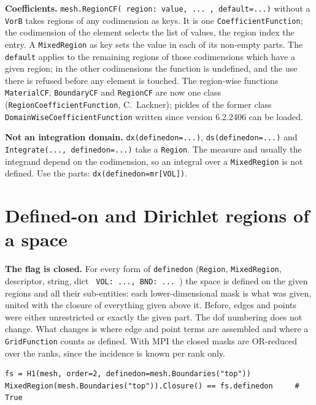 \documentclass[10pt,a4paper]{article}
\newcommand{\code}[1]{\texttt{#1}}
\newcommand{\lbr}{\char123 }\newcommand{\rbr}{\char125 }\newcommand{\tld}{\char126 }
\begin{document}
\textbf{Coefficients.} \code{mesh.RegionCF(\lbr region: value, ...\rbr, default=...)} without a \code{VorB} takes regions of any codimension as keys. It is one \code{CoefficientFunction}; the codimension of the element selects the list of values, the region index the entry. A \code{MixedRegion} as key sets the value in each of its non-empty parts. The \code{default} applies to the remaining regions of those codimensions which have a given region; in the other codimensions the function is undefined, and the use there is refused before any element is touched. The region-wise functions \code{MaterialCF}, \code{BoundaryCF} and \code{RegionCF} are now one class (\code{RegionCoefficientFunction}, C.~Lackner); pickles of the former class \code{DomainWiseCoefficientFunction} written since version 6.2.2406 can be loaded.

\textbf{Not an integration domain.} \code{dx(definedon=...)}, \code{ds(definedon=...)} and \code{Integrate(..., definedon=...)} take a \code{Region}. The measure and usually the integrand depend on the codimension, so an integral over a \code{MixedRegion} is not defined. Use the parts: \code{dx(definedon=mr[VOL])}.

\section{Defined-on and Dirichlet regions of a space}\label{sec:def}

\textbf{The flag is closed.} For every form of \code{definedon} (\code{Region}, \code{MixedRegion}, descriptor, string, dict \code{\lbr VOL: ..., BND: ...\rbr}) the space is defined on the given regions and all their sub-entities: each lower-dimensional mask is what was given, united with the closure of everything given above it. Before, edges and points were either unrestricted or exactly the given part. The dof numbering does not change. What changes is where edge and point terms are assembled and where a \code{GridFunction} counts as defined. With MPI the closed masks are OR-reduced over the ranks, since the incidence is known per rank only.
\begin{lstlisting}[numbers=none,xleftmargin=0pt]
fs = H1(mesh, order=2, definedon=mesh.Boundaries("top"))
MixedRegion(mesh.Boundaries("top")).Closure() == fs.definedon     # True
\end{lstlisting}
\end{document}
